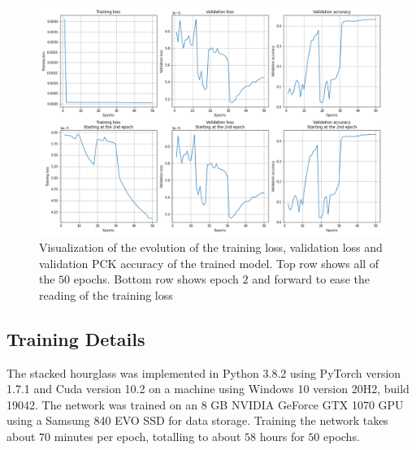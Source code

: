 \documentclass[./main.tex]{subfiles}
\begin{document}
\begin{figure}[t]
    \centering
    \includegraphics[width = \textwidth]{entities/results.png}
    \caption{Visualization of the evolution of the training loss, validation loss and validation PCK accuracy of the trained model. Top row shows all of the $50$ epochs. Bottom row shows epoch $2$ and forward to ease the reading of the training loss}
    \label{fig:results}
\end{figure}

\subsection{Training Details}\label{subsec:training_details}
The stacked hourglass was implemented in Python 3.8.2 using PyTorch version 1.7.1 and Cuda version 10.2 on a machine using Windows 10 version 20H2, build 19042. The network was trained on an 8 GB NVIDIA GeForce GTX 1070 GPU using a Samsung 840 EVO SSD for data storage. Training the network takes about $70$ minutes per epoch, totalling to about $58$ hours for $50$ epochs.
\end{document}
